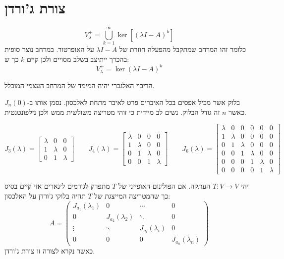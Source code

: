 \documentclass{tstextbook}
\begin{document}
\section{צורת ג'ורדן}

\begin{definition}
$$V_\lambda^+ = \bigcup_{k=1}^\infty \ker\left[(\lambda I - A)^k \right] $$
כלומר זהו המרחב שמתקבל מהפעלה חוזרת של \(\lambda I-A\) על האופרטור. במרחב נוצר סופית בהכרך ייתיצב בשלב מסויים ולכן קיים \(k\) כך ש:
$$V_{\lambda}^{+}=\ker \left( \lambda I-A \right)^{k}$$

\end{definition}
\begin{proposition}
הריבוי האלגברי יהיה המימד של המרחב העצמי המוכלל.

\end{proposition}
\begin{definition}
בלוק אשר מכיל אפסים בכל האיברים פרט לאיבר מתחת לאלכסון. נסמן אותו ב-\(J_{n}(0)\) כאשר \(n\) זה גודל הבלוק. נשים לב מיידית כי זוהי מטריצה משולשית ממש ולכן נילפונטנטית.

\end{definition}
\begin{example}
$$J_{3}\left( \lambda \right)= \left[\begin{matrix}\lambda & 0 & 0\\1 & \lambda & 0\\0 & 1 & \lambda\end{matrix}\right]\qquad J_{4}\left( \lambda \right)=\left[\begin{matrix}\lambda & 0 & 0 & 0\\1 & \lambda & 0 & 0\\0 & 1 & \lambda & 0\\0 & 0 & 1 & \lambda\end{matrix}\right]\qquad  J_{6}\left( \lambda \right)=\left[\begin{matrix}\lambda & 0 & 0 & 0 & 0 & 0\\1 & \lambda & 0 & 0 & 0 & 0\\0 & 1 & \lambda & 0 & 0 & 0\\0 & 0 & 1 & \lambda & 0 & 0\\0 & 0 & 0 & 1 & \lambda & 0\\0 & 0 & 0 & 0 & 1 & \lambda\end{matrix}\right]$$

\end{example}
\begin{theorem}[ג'ורדן]
יהי \(T:V\to V\) העתקה. אם הפולינום האופייני של \(T\) מתפרק לגורמים לינארים אזי קיים בסיס כך שהמטריצה המייצגת של \(T\) תהיה בלוקי ג'ורדן על האלכסון:
$$A=\begin{pmatrix}J_{a_{1}}(\lambda_{1})&0&\cdots&0\\ 0&J_{a_{2}}(\lambda_{2})&\ddots&0\\ \vdots&\ddots&J_{a_{i}}(\lambda_{i})&0\\ 0&0&0&J_{a_{n}}(\lambda_{n})\end{pmatrix}$$
כאשר נקרא לצורה זו צורת ג'ורדן.

\end{theorem}
\end{document}
